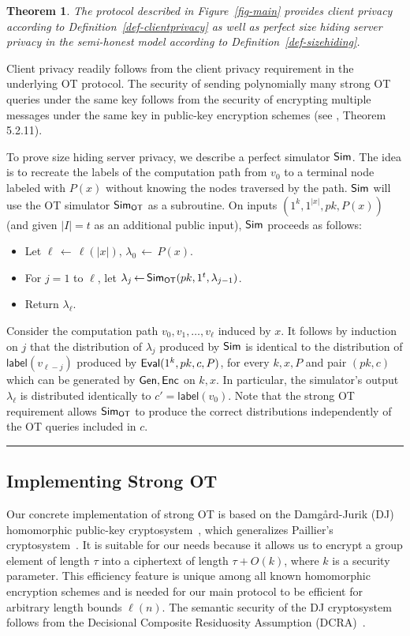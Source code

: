 \documentclass[11pt]{article}
\newtheorem{theorem}{Theorem}[section]{}
\newenvironment{proof}{\noindent {\bf Proof:} \hspace{.677em}}%
                     {\qed}
\newcommand{\qed}{\hspace*{\fill}\rule{0.6em}{0.6em}}
\newcommand{\from}{{\,\leftarrow\,}}
\newcommand{\poly}{{\mbox{\rm poly}}}
\newcommand{\lab}{{\mathsf{label}}}
\newcommand{\gen}{{\sf Gen}}
\newcommand{\enc}{{\sf Enc}}
\newcommand{\eval}{{\sf Eval}}
\renewcommand{\sim}{{\sf Sim}}
\newcommand{\simot}{{\sf Sim_{OT}}}
\newcommand{\otl}{{\tau}}
\begin{document}
\begin{theorem}\label{thm-semihonest}
The protocol described in Figure~\ref{fig-main} provides client
privacy according to Definition~\ref{def-clientprivacy} as well as
perfect size hiding server privacy in the semi-honest model
according to Definition~\ref{def-sizehiding}.
\end{theorem}
\begin{proof}
Client privacy readily follows from the client privacy requirement
in the underlying OT protocol. The security of sending polynomially
many strong OT queries under the same key follows from the security
of encrypting multiple messages under the same key in public-key
encryption schemes (see \cite{Gol04}, Theorem 5.2.11).

To prove size hiding server privacy, we describe a perfect simulator
$\sim$. The idea is to recreate the labels of the computation path
from $v_0$ to a terminal node labeled with $P(x)$ without knowing
the nodes traversed by the path. $\sim$ will use the OT simulator
$\simot$ as a subroutine. On inputs $(1^k,1^{|x|},pk,P(x))$ (and
given $|I|=t$ as an additional public input), $\sim$ proceeds as
follows:
\begin{itemize}
    \item Let $\ell\from\ell(|x|)$, $\lambda_0\from P(x)$.
    \item For $j=1$ to $\ell$, let
    $\lambda_j\from\simot(pk,1^t,\lambda_{j-1})$.
    \item Return $\lambda_\ell$.
\end{itemize}
Consider the computation path $v_0,v_1,\ldots,v_\ell$ induced by
$x$. It follows by induction on $j$ that the distribution of
$\lambda_j$ produced by $\sim$ is identical to the distribution of
$\lab(v_{\ell-j})$ produced by $\eval(1^k,pk,c,P)$, for every
$k,x,P$ and pair $(pk,c)$ which can be generated by $\gen,\enc$ on
$k,x$. In particular, the simulator's output $\lambda_\ell$ is
distributed identically to $c'=\lab(v_0)$. Note that the strong OT
requirement allows $\simot$ to produce the correct distributions
independently of the OT queries included in $c$.
\end{proof}

\subsection{Implementing Strong OT}
\label{sec-otimp}

Our concrete implementation of strong OT is based on the
Damg{\aa}rd-Jurik (DJ) homomorphic public-key
cryptosystem~\cite{DJ01}, which generalizes Paillier's
cryptosystem~\cite{Pai}. It is suitable for our needs because it
allows us to encrypt a group element of length $\otl$ into a
ciphertext of length $\otl+O(k)$, where $k$ is a security
parameter. This efficiency feature is unique among all known
homomorphic encryption schemes and is needed for our main protocol
to be efficient for arbitrary length bounds $\ell(n)$. The semantic
security of the DJ cryptosystem
follows from the Decisional Composite Residuosity Assumption
(DCRA)~\cite{DJ01}.
\end{document}

